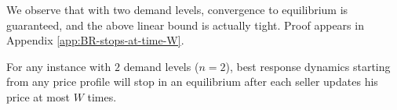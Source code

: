 We observe that with two demand levels, convergence to equilibrium is guaranteed, and the above linear bound is actually tight.
Proof appears in Appendix \ref{app:BR-stops-at-time-W}.
\begin{proposition}
	\label{obs:bsd-2-stops}
	For any instance with $2$ demand levels ($n=2$), best response dynamics starting from any price profile will stop in an
	equilibrium after each seller updates his price at most $W$ times.
\end{proposition}
%	
%	
%
%	
%	
%	
